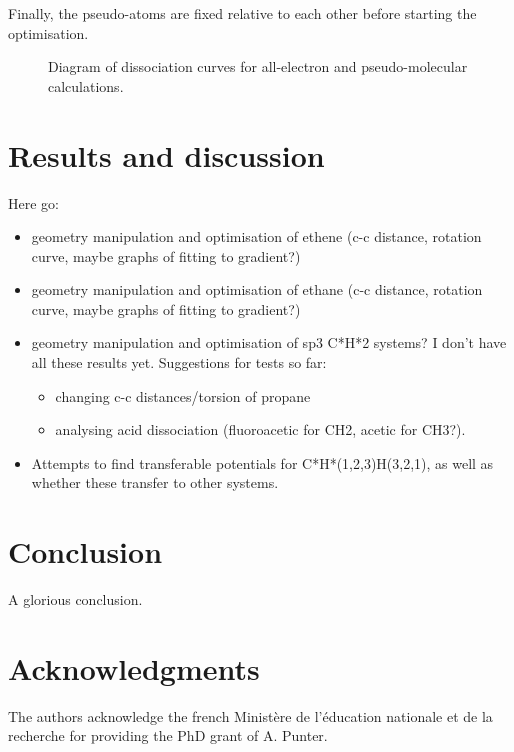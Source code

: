 \documentclass[aip,reprint]{revtex4-1}
\begin{document}
 Finally, the pseudo-atoms are fixed relative to each other before starting the optimisation.		
 		 
\begin{figure}
\begin{center}		 
\end{center}		
\vspace{0.25in}		 
\hspace*{3in}		
\caption{Diagram of dissociation curves for all-electron and pseudo-molecular calculations.}		
\label{figure:dissociation_diagram}
\end{figure}		

\section{Results and discussion}

Here go:

\begin{itemize}
\item geometry manipulation and optimisation of ethene (c-c distance, rotation curve, maybe graphs of fitting to gradient?)
\item geometry manipulation and optimisation of ethane (c-c distance, rotation curve, maybe graphs of fitting to gradient?)
\item geometry manipulation and optimisation of sp3 C*H*2 systems? I don't have all these results yet. Suggestions for tests so far:
\begin{itemize}
\item changing c-c distances/torsion of propane
\item analysing acid dissociation (fluoroacetic for CH2, acetic for CH3?).
\end{itemize}
\item Attempts to find transferable potentials for C*H*(1,2,3)H(3,2,1), as well as whether these transfer to other systems.
\end{itemize}


\section{Conclusion}

A glorious conclusion.

\section{Acknowledgments}
The authors acknowledge the french Ministère de l'éducation
nationale et de la recherche for providing the PhD grant of A. Punter.
\end{document}

